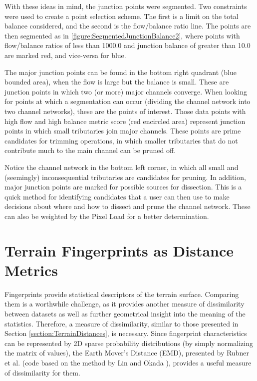 With these ideas in mind, the junction points were segmented. Two constraints were used to create a point selection scheme. The first is a limit on the total balance considered, and the second is the flow/balance ratio line. The points are then segmented as in \ref{figure:SegmentedJunctionBalance2}, where points with flow/balance ratios of less than 1000.0 and junction balance of greater than 10.0 are marked red, and vice-versa for blue.

The major junction points can be found in the bottom right quadrant (blue bounded area), when the flow is large but the balance is small. These are junction points in which two (or more) major channels converge. When looking for points at which a segmentation can occur (dividing the channel network into two channel networks), these are the points of interest. 
Those data points with high flow and high balance metric score (red encircled area) represent junction points in which small tributaries join major channels. These points are prime candidates for trimming operations, in which smaller tributaries that do not contribute much to the main channel can be pruned off.

% 
Notice the channel network in the bottom left corner, in which all small and (seemingly) inconsequential tributaries are candidates for pruning.
In addition, major junction points are marked for possible sources for dissection. This is a quick method for identifying candidates that a user can then use to make decisions about where and how to dissect and prune the channel network. These can also be weighted by the Pixel Load for a better determination.


\section{Terrain Fingerprints as Distance Metrics}
\label{section:FingerprintsAsMetrics}


Fingerprints provide statistical descriptors of the terrain surface. Comparing them is a worthwhile challenge, as it provides another measure of dissimilarity between datasets as well as further geometrical insight into the meaning of the statistics. Therefore, a measure of dissimilarity, similar to those presented in Section \ref{section:TerrainDistances}, is necessary. Since fingerprint characteristics can be represented by 2D sparse probability distributions (by simply normalizing the matrix of values), the Earth Mover's Distance (EMD), presented by Rubner et al. \cite{Rubner:2000:EMD:365875.365881} (code based on the method by Lin and Okada \cite{Ling:2007:EEM:1263143.1263456}), provides a useful measure of dissimilarity for them.

